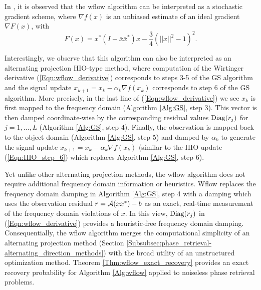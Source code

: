 In \cite[Section 2.3]{DBLP:journals/tit/CandesLS15}, it is observed that the wflow algorithm can be interpreted as a stochastic gradient scheme, where $\nabla f(x)$ is an unbiased estimate of an ideal gradient $\nabla F(x)$, with
\begin{equation}
F(x) = x^* \left( I - \bar{x}\bar{x}^* \right) x - \frac{3}{4} \left( ||x||^2 - 1\right)^2.
\end{equation}

Interestingly, we observe that this algorithm can also be interpreted as an alternating projection HIO-type method, where computation of the Wirtinger derivative (\ref{Eqn:wflow_derivative}) corresponds to steps 3-5 of the GS algorithm and the signal update $x_{k+1} = x_k - \alpha_k \nabla f(x_k)$ corresponds to step 6 of the GS algorithm.  More precisely, in the last line of (\ref{Eqn:wflow_derivative}) we see $x_k$ is first mapped to the frequency domain (Algorithm \ref{Alg:GS}, step 3).  This vector is then damped coordinate-wise by the corresponding residual values $\textnormal{Diag}(r_j)$ for $j = 1, \ldots, L$  (Algorithm \ref{Alg:GS}, step 4).  Finally, the observation is mapped back to the object domain (Algorithm \ref{Alg:GS}, step 5) and damped by $\alpha_k$ to generate the signal update $x_{k+1} = x_k - \alpha_k \nabla f(x_k)$ (similar to the HIO update (\ref{Eqn:HIO_step_6}) which replaces Algorithm \ref{Alg:GS}, step 6).  

Yet unlike other alternating projection methods, the wflow algorithm does not require additional frequency domain information or heuristics.  Wflow replaces the frequency domain damping in Algorithm \ref{Alg:GS}, step 4 with a damping which uses the observation residual $r = {\mathcal A}(xx^*) - b$ as an exact, real-time measurement of the frequency domain violations of $x$.  In this view, $\textnormal{Diag}(r_j)$ in (\ref{Eqn:wflow_derivative}) provides a heuristic-free frequency domain damping.  Consequentially, the wflow algorithm merges the computational simplicity of an alternating projection method (Section  \ref{Subsubsec:phase_retrieval-alternating_direction_methods}) with the broad utility of an unstructured optimization method.  Theorem \ref{Thm:wflow_exact_recovery} provides an exact recovery probability for Algorithm \ref{Alg:wflow} applied to noiseless phase retrieval problems.

